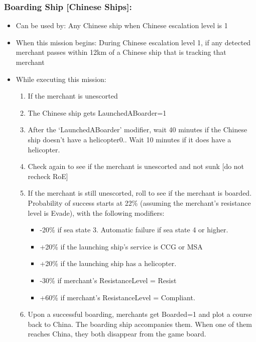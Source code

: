 \documentclass{article}
\begin{document}
    \subsubsection{Boarding Ship [Chinese Ships]:}
        \begin{itemize}
            \item{Can be used by:} Any Chinese ship when Chinese escalation level is 1
            \item{When this mission begins:} During Chinese escalation level 1, if any detected merchant passes within 12km of a Chinese ship that is tracking that merchant
            \item{While executing this mission:} 
            \begin{enumerate}[label=\arabic*)]
                \item If the merchant is unescorted
                \item The Chinese ship gets LaunchedABoarder=1
                \item After the `LaunchedABoarder' modifier, wait 40 minutes if the Chinese ship doesn't have a helicopter0.. Wait 10 minutes if it does have a helicopter. 
                \item Check again to see if the merchant is unescorted and not sunk [do not recheck RoE]
                \item If the merchant is still unescorted, roll to see if the merchant is boarded. Probability of success starts at 22\% (assuming the merchant's resistance level is Evade), with the following modifiers:
                    \begin{itemize}
                        \item -20\% if sea state 3. Automatic failure if sea state 4 or higher.
                        \item +20\% if the launching ship's service is CCG or MSA
                        \item +20\% if the launching ship has a helicopter.
                        \item -30\% if merchant’s ResistanceLevel = Resist
                        \item +60\% if merchant’s ResistanceLevel = Compliant.
                    \end{itemize}
                \item Upon a successful boarding, merchants get Boarded=1 and plot a course back to China. The boarding ship accompanies them. When one of them reaches China, they both disappear from the game board.

\end{enumerate}
\end{itemize}
\end{document}
